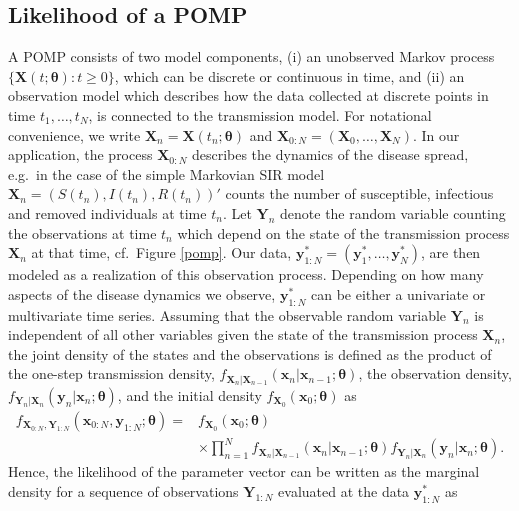 \subsection{Likelihood of a POMP}
A POMP consists of two model components, (i) an unobserved Markov process $\{\bm{X}(t;\bm{\theta}): t \geq 0 \}$, which can be discrete or continuous in time,  and (ii) an observation model which describes how the data collected at discrete points in time $t_1,\dots ,t_N$, is connected to the transmission model. For notational convenience, we write $\bm{X}_n=\bm{X}(t_n;\bm{\theta})$
and $\bm{X}_{0:N}=(\bm{X}_0,\dots,\bm{X}_N)$. In our application, the process $\bm{X}_{0:N}$ describes the dynamics of the disease spread, e.g.\ in the case of the simple Markovian SIR model $\bm{X}_n= (S(t_n),I(t_n), R(t_n))'$  counts the number of susceptible, infectious and removed individuals at time $t_n$.
Let $\bm{Y}_n$ denote the random variable counting the observations at time $t_n$ which depend on the state of the transmission process $\bm{X}_n$ at that time, cf.\  Figure \ref{pomp}. 
Our data, $\bm{y}^*_{1:N} = (\bm{y}^*_{1} , \dots,\bm{y}^*_{N})$, are then
modeled as a realization of this observation process.  Depending  on how many aspects of the disease dynamics we observe, $\bm{y}^*_{1:N}$ can be either a univariate or multivariate time series. Assuming that the observable random variable  $\bm{Y}_n$ is independent of all other variables given  the state of the transmission process $\bm{X}_{n}$, the joint density of the states and the observations is defined as the product of the   one-step transmission density, $f_{\bm{X}_n|\bm{X}_{n-1}}(\bm{x}_n|\bm{x}_{n-1};\bm{\theta})$, the  observation density, $f_{\bm{Y}_n|\bm{X}_{n}}(\bm{y}_n|\bm{x}_{n};\bm{\theta})$, and the initial density $f_{\bm {X}_0}(\bm{x}_0;\bm{\theta})$ as 
\begin{align*}
f_{\bm{X}_{0:N},\bm{Y}_{1:N}}(\bm{x}_{0:N},\bm{y}_{1:N};\bm{\theta})=&f_{\bm{X}_0}(\bm{x}_0;\bm{\theta})\\
&\times \prod_{n=1}^{N}f_{\bm{X}_n|\bm{X}_{n-1}}(\bm{x}_n|\bm{x}_{n-1};\bm{\theta})f_{\bm{Y}_n|\bm{X}_{n}}(\bm{y}_n|\bm{x}_{n};\bm{\theta}).
\end{align*} 
Hence, the likelihood of the parameter vector can be written as the marginal density for a sequence of observations $\bm{Y}_{1:N}$ evaluated at the data $\bm{y}^*_{1:N}$ as

